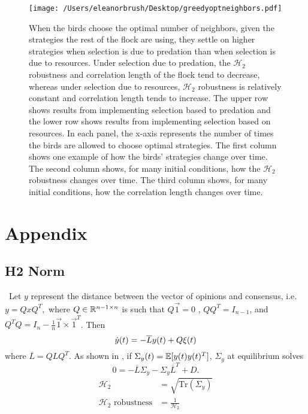 \documentclass{article}
\newcommand{\Tr}{\text{Tr}}
\begin{document}
\begin{figure}[ht]
\texttt{[image: /Users/eleanorbrush/Desktop/greedyoptneighbors.pdf]}
\caption{\label{greedyopt} When the birds choose the optimal number of neighbors, given the strategies the rest of the flock are using, they settle on higher strategies when selection is due to predation than when selection is due to resources. Under selection due to predation, the $\mathscr{H}_2$ robustness and correlation length of the flock tend to decrease, whereas under selection due to resources, $\mathscr{H}_2$ robustness is relatively constant and correlation length tends to increase. The upper row shows results from implementing selection based to predation and the lower row shows results from implementing selection based on resources. In each panel, the x-axis represents the number of times the birds are allowed to choose optimal strategies. The first column shows one example of how the birds' strategies change over time. The second column shows, for many initial conditions, how the $\mathscr{H}_2$ robustness changes over time. The third column shows, for many initial conditions, how the correlation length changes over time.
}
\end{figure}

\section{Appendix}
\subsection{H2 Norm \label{H2}} 

\ Let $y$ represent the distance between the vector of opinions and consensus, i.e.
$y=QxQ^T,$
where $Q\in{\mathbb{R}}^{n-1\times n}$ is such that $Q\vec{1}=0$ , $QQ^T=I_{n-1}$, and $Q^TQ=I_n-\frac{1}{n}\vec{1}\times\vec{1}^T$.   
Then 
\begin{equation}
\dot{y}(t)=-\overline{L}y(t)+Q\xi(t) \notag
\end{equation}
where $\overline{L}=QLQ^T$.  As shown in \cite{Young:2010fk}, if $\Sigma_y(t)={\mathbb{E}}[y(t)y(t)^T]$,  $\Sigma_y$ at equilibrium solves
\begin{equation} 0=-\overline{L}\Sigma_y-\Sigma_y\overline{L}^T+D. \label{h2norm}
\end{equation}
\begin{align*}
\mathscr{H}_2&=\sqrt{\Tr(\Sigma_y)}
\\\mathscr{H}_2 \text{ robustness} &=\frac{1}{\mathscr{H}_2}
\end{align*}
\end{document}
